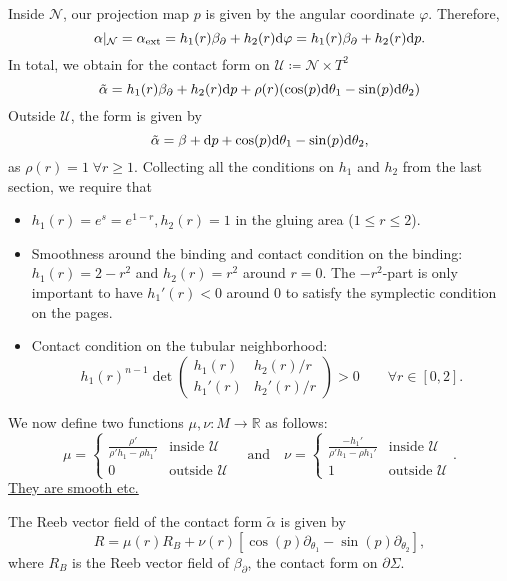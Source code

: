 Inside $\mathcal{N}$, our projection map $p$ is given by the angular coordinate $\varphi$. Therefore,
\[
    \alpha|_\mathcal{N} = \alpha_\text{ext} = h_1(r)\beta_\partial + h_2(r)\mathrm{d} \varphi = h_1(r)\beta_\partial + h_2(r)\mathrm{d} p.
\]
In total, we obtain for the contact form on $\mathcal{U} \coloneqq \mathcal{N}\times T^2$
\[
    \tilde \alpha = h_1(r)\beta_\partial + h_2(r)\mathrm{d} p + \rho(r)(\cos(p) \mathrm{d} \theta_1 - \sin(p) \mathrm{d} \theta_2)
\]
Outside $\mathcal{U}$, the form is given by
\[
    \tilde \alpha = \beta + \mathrm{d} p + \cos(p) \mathrm{d}\theta_1 - \sin(p) \mathrm{d} \theta_2,
\]
as $\rho(r) = 1\; \forall r \geq 1$.
Collecting all the conditions on $h_1$ and $h_2$ from the last section, we require that
\begin{itemize}
    \item $h_1(r) = e^s = e^{1-r}, h_2(r) = 1$ in the gluing area ($ 1 \le r \le 2$).
    \item Smoothness around the binding and contact condition on the binding: $h_1(r) = 2 - r^2$ and $h_2(r) = r^2$ around $r = 0$.
    The $-r^2$-part is only important to have $h_1'(r) < 0$ around $0$ to satisfy the symplectic condition on the pages.
    \item Contact condition on the tubular neighborhood: \[
        h_1(r)^{n-1}\det \begin{pmatrix}
            h_1(r) & h_2(r)/r\\
            h_1'(r) & h_2'(r)/r
        \end{pmatrix} > 0 \qquad \forall r \in [0,2].
    \]
\end{itemize}
We now define two functions $\mu, \nu: M \to \mathbb R$ as follows:
\[
    \mu = \begin{cases}
        \frac{\rho'}{\rho' h_1 - \rho h_1'} &\text{inside } \mathcal{U}\\
        0 &\text{outside } \mathcal{U} 
    \end{cases}  
    \quad \text{and} \quad 
    \nu = \begin{cases}
        \frac{-h_1'}{\rho' h_1 - \rho h_1'} &\text{inside } \mathcal{U}\\
        1 &\text{outside } \mathcal{U}
    \end{cases}.
\]
\underline{They are smooth etc.}
\begin{lemma}
    The Reeb vector field of the contact form $\tilde \alpha$ is given by
    \[
        R = \mu(r)R_B + \nu(r)[\cos(p)\partial_{\theta_1} - \sin(p)\partial_{\theta_2}],
    \]
    where $R_B$ is the Reeb vector field of $\beta_\partial$, the contact form on $\partial \Sigma$.
\end{lemma}
